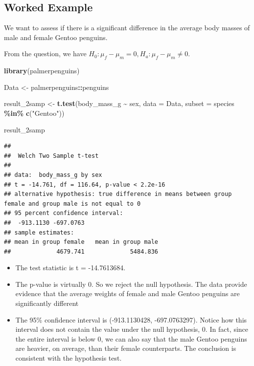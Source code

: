 \documentclass[
]{book}
\newenvironment{Shaded}{\begin{snugshade}}{\end{snugshade}}
\newcommand{\AttributeTok}[1]{\textcolor[rgb]{0.13,0.29,0.53}{#1}}
\newcommand{\FunctionTok}[1]{\textcolor[rgb]{0.13,0.29,0.53}{\textbf{#1}}}
\newcommand{\NormalTok}[1]{#1}
\newcommand{\OtherTok}[1]{\textcolor[rgb]{0.56,0.35,0.01}{#1}}
\newcommand{\SpecialCharTok}[1]{\textcolor[rgb]{0.81,0.36,0.00}{\textbf{#1}}}
\newcommand{\StringTok}[1]{\textcolor[rgb]{0.31,0.60,0.02}{#1}}
\providecommand{\tightlist}{%
  \setlength{\itemsep}{0pt}\setlength{\parskip}{0pt}}
\theoremstyle{definition}
\theoremstyle{definition}
\theoremstyle{definition}
\theoremstyle{definition}
\theoremstyle{remark}
\begin{document}
\hypertarget{eg2t}{%
\subsection{Worked Example}\label{eg2t}}

We want to assess if there is a significant difference in the average body masses of male and female Gentoo penguins.

From the question, we have \(H_0: \mu_f - \mu_m = 0, H_a: \mu_f - \mu_m \neq 0\).

\begin{Shaded}
\begin{Highlighting}[]
\FunctionTok{library}\NormalTok{(palmerpenguins)}

\NormalTok{Data }\OtherTok{\textless{}{-}}\NormalTok{ palmerpenguins}\SpecialCharTok{::}\NormalTok{penguins}

\NormalTok{result\_2samp }\OtherTok{\textless{}{-}} \FunctionTok{t.test}\NormalTok{(body\_mass\_g }\SpecialCharTok{\textasciitilde{}}\NormalTok{ sex, }\AttributeTok{data =}\NormalTok{ Data,}
       \AttributeTok{subset =}\NormalTok{ species }\SpecialCharTok{\%in\%} \FunctionTok{c}\NormalTok{(}\StringTok{"Gentoo"}\NormalTok{))}

\NormalTok{result\_2samp}
\end{Highlighting}
\end{Shaded}

\begin{verbatim}
## 
##  Welch Two Sample t-test
## 
## data:  body_mass_g by sex
## t = -14.761, df = 116.64, p-value < 2.2e-16
## alternative hypothesis: true difference in means between group female and group male is not equal to 0
## 95 percent confidence interval:
##  -913.1130 -697.0763
## sample estimates:
## mean in group female   mean in group male 
##             4679.741             5484.836
\end{verbatim}

\begin{itemize}
\tightlist
\item
  The test statistic is t = -14.7613684.
\item
  The p-value is virtually 0. So we reject the null hypothesis. The data provide evidence that the average weights of female and male Gentoo penguins are significantly different
\item
  The 95\% confidence interval is (-913.1130428, -697.0763297). Notice how this interval does not contain the value under the null hypothesis, 0. In fact, since the entire interval is below 0, we can also say that the male Gentoo penguins are heavier, on average, than their female counterparts. The conclusion is consistent with the hypothesis test.
\end{itemize}
\end{document}
